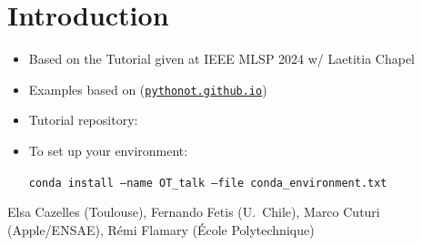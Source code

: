 \documentclass[pdf,aspectratio=169,10pt]{beamer}
\begin{document}
\section{Introduction}
\begin{frame}
\begin{itemize}
    \item Based on the Tutorial  given at IEEE MLSP 2024 w/ Laetitia Chapel
    \item Examples based on  (\href{https://pythonot.github.io/}{\texttt{pythonot.github.io}})
    \item Tutorial repository: 
    \item To set up your environment:
    \vspace{1em}
    \begin{tcolorbox}[colback=blue!5!white,colframe=blue!75!black]
    \centering
  \texttt{conda install --name OT\_talk --file conda\_environment.txt}
\end{tcolorbox}


\end{itemize}
\vspace{3em}
 Elsa Cazelles (Toulouse), Fernando Fetis (U.~Chile), Marco Cuturi (Apple/ENSAE), Rémi Flamary (École Polytechnique) 

\end{frame}
\end{document}

